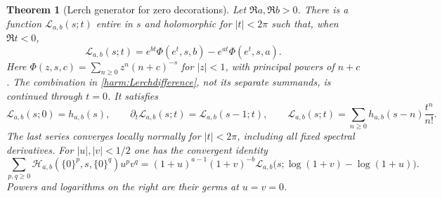 \documentclass[11pt,a4paper]{article}
\numberwithin{equation}{section}
\newtheorem{theorem}{Theorem}[section]
\theoremstyle{definition}
\theoremstyle{remark}
\begin{document}
\begin{theorem}[Lerch generator for zero decorations]
\label{harm:Lerch}
Let $\Re a,\Re b>0$. There is a function
$\mathcal L_{a,b}(s;t)$ entire in $s$ and holomorphic for $|t|<2\pi$
such that, when $\Re t<0$,
\begin{equation}
 \mathcal L_{a,b}(s;t)=
    e^{bt}\Phi(e^t,s,b)-e^{at}\Phi(e^t,s,a).
 \label{harm:Lerchdifference}
\end{equation}
Here $\Phi(z,s,c)=\sum_{n\ge0}z^n(n+c)^{-s}$ for $|z|<1$, with
principal powers of $n+c$. The combination in
\eqref{harm:Lerchdifference}, not its separate summands, is continued
through $t=0$. It satisfies
\begin{equation}
 \mathcal L_{a,b}(s;0)=h_{a,b}(s),\qquad
 \partial_t\mathcal L_{a,b}(s;t)=\mathcal L_{a,b}(s-1;t),\qquad
 \mathcal L_{a,b}(s;t)=\sum_{n\ge0}h_{a,b}(s-n)\frac{t^n}{n!}.
 \label{harm:LerchTaylor}
\end{equation}
The last series converges locally normally for $|t|<2\pi$, including
all fixed spectral derivatives. For $|u|,|v|<1/2$ one has the convergent
identity
\begin{equation}
 \boxed{\displaystyle
 \sum_{p,q\ge0}\mathcal H_{a,b}(\{0\}^p,s,\{0\}^q)u^pv^q
  =(1+u)^{a-1}(1+v)^{-b}
    \mathcal L_{a,b}\bigl(s;\log(1+v)-\log(1+u)\bigr).}
 \label{harm:zerogenerator}
\end{equation}
Powers and logarithms on the right are their germs at $u=v=0$.
\end{theorem}
\end{document}
